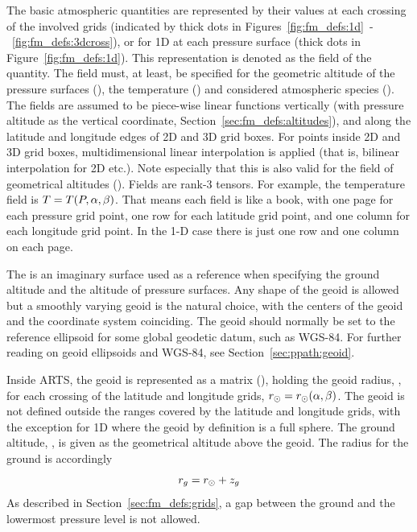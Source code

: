 The basic atmospheric quantities are represented by their values at
each crossing of the involved grids (indicated by thick dots in
Figures~\ref{fig:fm_defs:1d}~-~\ref{fig:fm_defs:3dcross}), or for 1D
at each pressure surface (thick dots in Figure~\ref{fig:fm_defs:1d}).
This representation is denoted as the field
of the quantity. The field must, at least, be specified for the
geometric altitude of the pressure surfaces (), the
temperature () and considered atmospheric species
().  The fields are assumed to be piece-wise
linear functions vertically (with pressure altitude as the vertical
coordinate, Section~\ref{sec:fm_defs:altitudes}), and along the
latitude and longitude edges of 2D and 3D grid boxes. For points
inside 2D and 3D grid boxes, multidimensional linear interpolation is
applied (that is, bilinear interpolation for 2D etc.). Note especially
that this is also valid for the field of geometrical altitudes
(). Fields are rank-3 tensors. For example, the
temperature field is $T=T(P,\alpha,\beta)$. That means each field is
like a book, with one page for each pressure grid point, one row for
each latitude grid point, and one column for each longitude grid
point. In the 1-D case there is just one row and one column on each
page.



\label{sec:fm_defs:geoid}

The  is an imaginary surface used as a
reference when specifying the ground altitude and the altitude
of pressure surfaces. Any shape of the geoid is allowed but a smoothly
varying geoid is the natural choice, with the centers of the geoid and
the coordinate system coinciding. The geoid should normally be set to
the reference ellipsoid for some global geodetic datum, such as
WGS-84. For further reading on geoid ellipsoids and WGS-84, see
Section~\ref{sec:ppath:geoid}.

Inside ARTS, the geoid is represented as a matrix
(), holding the geoid radius, \aRds{\odot}, for
each crossing of the latitude and longitude grids,
$r_{\odot}=r_{\odot}(\alpha,\beta)$. The geoid is not defined
outside the ranges covered by the latitude and longitude grids, with
the exception for 1D where the geoid by definition is a full sphere.
The ground altitude, , is given as the geometrical altitude
above the geoid. The radius for the ground is accordingly
\begin{equation}
  r_{g} = r_{\odot} + z_{g}
 \label{eq:fm_defs:zground}
\end{equation}
As described in
Section~\ref{sec:fm_defs:grids}, a gap between the ground and the 
lowermost pressure level is not allowed.

